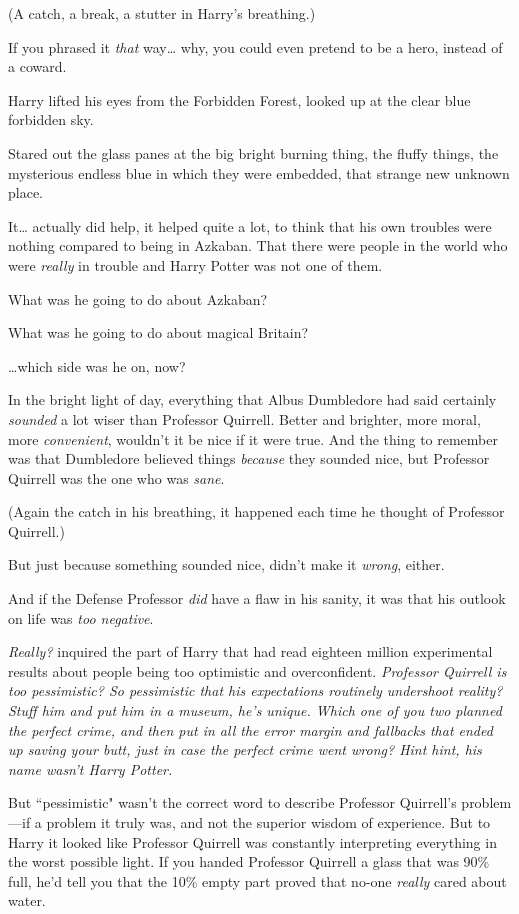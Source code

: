 (A catch, a break, a stutter in Harry's breathing.)

If you phrased it \emph{that} way{\ldots} why, you could even pretend to be a hero, instead of a coward.

Harry lifted his eyes from the Forbidden Forest, looked up at the clear blue forbidden sky.

Stared out the glass panes at the big bright burning thing, the fluffy things, the mysterious endless blue in which they were embedded, that strange new unknown place.

It{\ldots} actually did help, it helped quite a lot, to think that his own troubles were nothing compared to being in Azkaban. That there were people in the world who were \emph{really} in trouble and Harry Potter was not one of them.

What was he going to do about Azkaban?

What was he going to do about magical Britain?

{\ldots}which side was he on, now?

In the bright light of day, everything that Albus Dumbledore had said certainly \emph{sounded} a lot wiser than Professor Quirrell. Better and brighter, more moral, more \emph{convenient}, wouldn't it be nice if it were true. And the thing to remember was that Dumbledore believed things \emph{because} they sounded nice, but Professor Quirrell was the one who was \emph{sane}.

(Again the catch in his breathing, it happened each time he thought of Professor Quirrell.)

But just because something sounded nice, didn't make it \emph{wrong}, either.

And if the Defense Professor \emph{did} have a flaw in his sanity, it was that his outlook on life was \emph{too negative}.

\emph{Really?} inquired the part of Harry that had read eighteen million experimental results about people being too optimistic and overconfident. \emph{Professor Quirrell is too pessimistic? So pessimistic that his expectations routinely \emph{undershoot} reality? Stuff him and put him in a museum, he's unique. Which one of you two planned the perfect crime, and \emph{then} put in all the error margin and fallbacks that ended up saving your butt, \emph{just in case} the perfect crime went wrong? Hint hint, his name wasn't Harry Potter.}

But ``pessimistic" wasn't the correct word to describe Professor Quirrell's problem—if a problem it truly was, and not the superior wisdom of experience. But to Harry it looked like Professor Quirrell was constantly interpreting everything in the worst possible light. If you handed Professor Quirrell a glass that was 90\% full, he'd tell you that the 10\% empty part proved that no-one \emph{really} cared about water.


